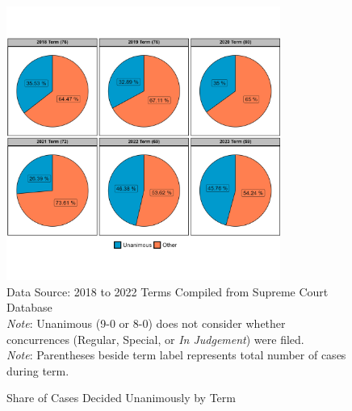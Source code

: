 \begin{landscape}
\begin{figure}[H]
    \centering
    \caption{Share of Cases Decided Unanimously by Term}
    \includegraphics[width=0.8\textwidth]{Figures/statpack_figures/share_of_unanimity_2018_2023.png} \\
    \footnotesize{Data Source: 2018 to 2022 Terms Compiled from Supreme Court Database} \\
    \footnotesize{\emph{Note}: Unanimous (9-0 or 8-0) does not consider whether concurrences (Regular, Special, or \emph{In Judgement}) were filed.} \\
    \footnotesize{\emph{Note}: Parentheses beside term label represents total number of cases during term.}
\end{figure}
\end{landscape}








